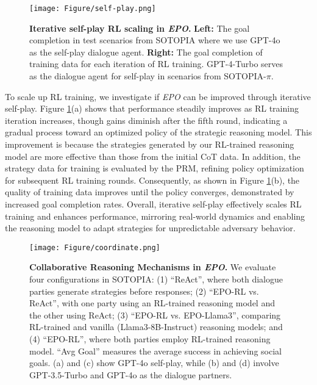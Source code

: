 \begin{figure}[t]
\begin{center}
\centerline{\texttt{[image: Figure/self-play.png]}}
\caption{\textbf{Iterative self-play RL scaling in \textit{EPO}.}
\textbf{Left:} The goal completion in test scenarios from SOTOPIA where we use GPT-4o as the self-play dialogue agent.
\textbf{Right:} The goal completion of training data for each iteration of RL training. GPT-4-Turbo serves as the dialogue agent for self-play in scenarios from SOTOPIA-$\pi$.}

\label{fig:self-play}
\end{center}
\end{figure}


To scale up RL training, we investigate if \textit{EPO} can be improved through iterative self-play.
Figure \ref{fig:self-play}(a) shows that performance steadily improves as RL training iteration increases, though gains diminish after the fifth round, indicating a gradual process toward an optimized policy of the strategic reasoning model. This improvement is because the strategies generated by our RL-trained reasoning model are more effective than those from the initial CoT data.
In addition, the strategy data for training is evaluated by the PRM, refining policy optimization for subsequent RL training rounds. Consequently, as shown in Figure \ref{fig:self-play}(b), the quality of training data improves until the policy converges, demonstrated by increased goal completion rates.
Overall, iterative self-play effectively scales RL training and enhances performance, mirroring real-world dynamics and enabling the reasoning model to adapt strategies for unpredictable adversary behavior.




\begin{figure}[t]
\centering
\centerline{\texttt{[image: Figure/coordinate.png]}}
\caption{\textbf{Collaborative Reasoning Mechanisms in \textit{EPO}.} We evaluate four configurations in SOTOPIA: (1) “ReAct”, where both dialogue parties generate strategies before responses; (2) “EPO-RL vs. ReAct”, with one party using an RL-trained reasoning model and the other using ReAct; (3) “EPO-RL vs. EPO-Llama3”, comparing RL-trained and vanilla (Llama3-8B-Instruct) reasoning models; and (4) “EPO-RL”, where both parties employ RL-trained reasoning model. “Avg Goal” measures the average success in achieving social goals. (a) and (c) show GPT-4o self-play, while (b) and (d) involve GPT-3.5-Turbo and GPT-4o as the dialogue partners.
}
\label{fig:coordinate}
\end{figure}


